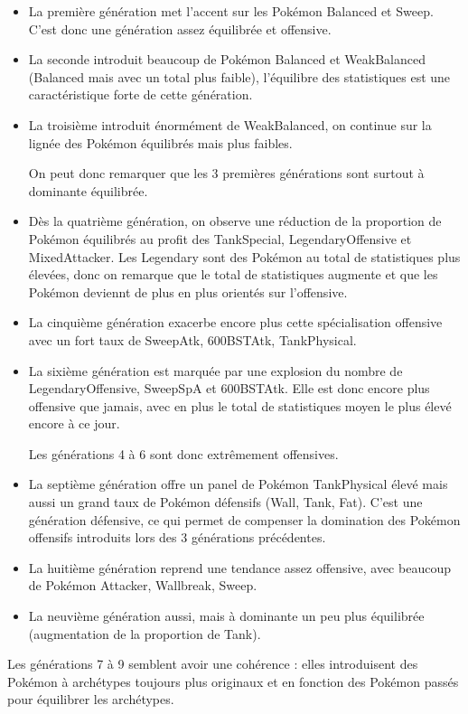 \documentclass[a4paper,12pt]{article}
\begin{document}
\begin{itemize}
    \item La première génération met l'accent sur les Pokémon Balanced et Sweep. C'est donc une génération assez équilibrée et offensive.
    \item La seconde introduit beaucoup de Pokémon Balanced et WeakBalanced (Balanced mais avec un total plus faible), l'équilibre des statistiques est une caractéristique forte de cette génération.
    \item La troisième introduit énormément de WeakBalanced, on continue sur la lignée des Pokémon équilibrés mais plus faibles.
    
On peut donc remarquer que les 3 premières générations sont surtout à dominante équilibrée.
    \item Dès la quatrième génération, on observe une réduction de la proportion de Pokémon équilibrés au profit des TankSpecial, LegendaryOffensive et MixedAttacker. Les Legendary sont des Pokémon au total de statistiques plus élevées, donc on remarque que le total de statistiques augmente et que les Pokémon deviennt de plus en plus orientés sur l'offensive.
    \item La cinquième génération exacerbe encore plus cette spécialisation offensive avec un fort taux de SweepAtk, 600BSTAtk, TankPhysical.
    \item La sixième génération est marquée par une explosion du nombre de LegendaryOffensive, SweepSpA et 600BSTAtk. Elle est donc encore plus offensive que jamais, avec en plus le total de statistiques moyen le plus élevé encore à ce jour.

Les générations 4 à 6 sont donc extrêmement offensives.
    \item La septième génération offre un panel de Pokémon TankPhysical élevé mais aussi un grand taux de Pokémon défensifs (Wall, Tank, Fat). C'est une génération défensive, ce qui permet de compenser la domination des Pokémon offensifs introduits lors des 3 générations précédentes.
    \item La huitième génération reprend une tendance assez offensive, avec beaucoup de Pokémon Attacker, Wallbreak, Sweep.
    \item La neuvième génération aussi, mais à dominante un peu plus équilibrée (augmentation de la proportion de Tank).
\end{itemize}

Les générations 7 à 9 semblent avoir une cohérence : elles introduisent des Pokémon à archétypes toujours plus originaux et en fonction des Pokémon passés pour équilibrer les archétypes.
\end{document}
